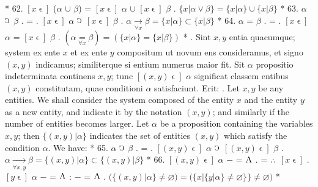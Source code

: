 \documentclass{book}
\newcommand{\C}{\mathop{\sbox0{$\displaystyle$$\reflectbox{C}$} %
\raisebox{-\height+\ht0-0.05cm}[\ht0][\dp0]{\scalebox{0.8}[0.8]{\copy0}}}\displaylimits} %
\newcommand{\pppNoSpace}{\leavevmode\lower0ex\hbox{.}\kern-0.1em\raise0.7ex\hbox{.}\kern-0.1em\lower0ex\hbox{.}} %
\newcommand{\abs}{\mathop{\rotatebox[origin=c]{180}{V}}}
\newcommand{\smallIn}{\ensuremath{\mathrel{\epsilon}}}
\newenvironment{translateTwoCol}
               { %
                 \columnratio{0.5, 0.5}
                 \begin{paracol}{2}
                 \newcommand{\LAT}{\switchcolumn[0]*}
                 \newcommand{\ENG}{\switchcolumn[1]}
               }
               { %
                 \let\ENG\undefined
                 \let\LAT\undefined
                 \end{paracol}
               }
\begin{document}
\begin{translateTwoCol}
\LAT
62. \hspace{0.67cm} $[x\smallIn]$ ($\alpha$ $\cup$ $\beta$) = $[x\smallIn]$ $\alpha$ $\cup$ $[x\smallIn]$ $\beta$
\ENG
62. \hspace{0.67cm} $\{ x | \alpha \vee \beta \} = \{ x | \alpha \} \cup \{ x | \beta \}$
\LAT
63. \hspace{0.67cm} $\alpha$ $\C$\scalebox{0.7}{$x$} $\beta$ . = . $[x\smallIn]$ $\alpha$  $\C$ $[x\smallIn]$ $\beta$
\ENG
63. \hspace{0.67cm} $\alpha \xrightarrow[\forall x]{} \beta = \{x | \alpha\} \subset \{x | \beta \}$
\LAT
64. \hspace{0.67cm} $\alpha$ =\scalebox{0.7}{$x$} $\beta$ . = . $[x\smallIn]$ $\alpha$ = $[x\smallIn]$ $\beta$
\ENG
64. \hspace{0.67cm} $(\alpha \underset{\forall x}= \beta) = (\{ x |  \alpha\} = \{x | \beta \} )$
\LAT
{}. Sint $x,y$ entia quacumque; system ex ente $x$ et ex ente $y$ compositum ut novum ens consideramus, et signo $(x,y)$ indicamus; similiterque si entium numerus maior fit. Sit $\alpha$ propositio indeterminata continens $x,y$; tunc $[(x,y)\smallIn]$ $\alpha$ significat classem entibus $(x,y)$ constitutam, quae conditioni $\alpha$ satisfaciunt. Erit:
\ENG
{}. Let $x,y$ be any entities. We shall consider the system composed of the entity $x$ and the entity $y$ as a new entity, and indicate it by the notation $(x,y)$; and similarly if the number of entities becomes larger. Let $\alpha$ be a proposition containing the variables $x,y$; then $\{(x,y) | \alpha \}$ indicates the set of entities $(x,y)$ which satisfy the condition $\alpha$. We have:   %
\LAT
65. \hspace{0.67cm} $\alpha$ $\C$\scalebox{0.7}{$x, y$} $\beta$ . = . $[(x, y)\smallIn]$ $\alpha$  $\C$ $[(x, y)\smallIn]$ $\beta$
\ENG
65. \hspace{0.67cm} $\alpha \xrightarrow[\forall x,y]{} \beta = \{(x,y) | \alpha\} \subset \{(x,y) | \beta \}$
\LAT
66. \hspace{0.67cm} $[(x, y)\smallIn]$ $\alpha$ $-$ = $\abs$ . = $\pppNoSpace$ $[x\smallIn]$ . $[y\smallIn]$ $\alpha$ $-$ = $\abs$ : $-$ = $\abs$
\ENG
66. \hspace{0.67cm} $\Big( \{ (x,y) | \alpha \} \neq \varnothing \Big) = \Big( \{ x | \{ y | \alpha \} \neq \varnothing \} \} \neq \varnothing \Big)$   %
\LAT

\end{translateTwoCol}
\end{document}
